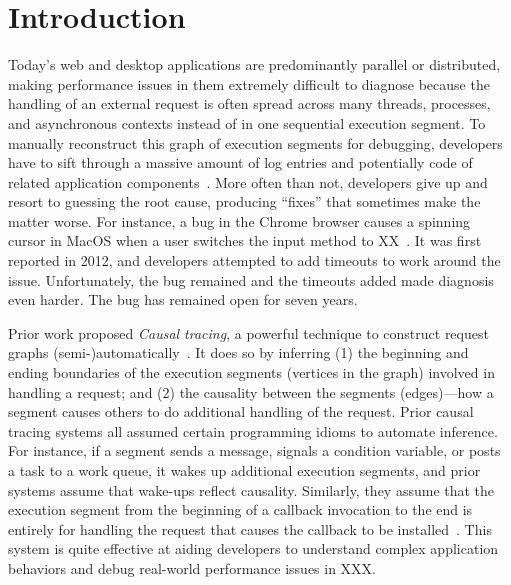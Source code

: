 \section{Introduction} \label{sec:intro}
%

%

Today's web and desktop applications are predominantly parallel or
distributed, making performance issues in them extremely difficult to
diagnose because the handling of an external request is often spread
across many threads, processes, and asynchronous
contexts
instead of in one
sequential execution segment.  To manually reconstruct this graph of
execution segments for debugging, developers have to sift through a
massive amount of log entries and potentially code of related application
components~\cite{luXXXXX}.  More often than not, developers give up and resort to
guessing the root cause, producing ``fixes'' that sometimes make the matter
worse.  For instance, a bug in the Chrome browser causes a spinning cursor
in MacOS when a user switches the input method to XX~\cite{bug-url}.  It
was first reported in 2012, and developers attempted to add timeouts
to work around the issue.  Unfortunately, the bug remained and the timeouts
added made diagnosis even harder.  The bug has remained open for seven years.

Prior work proposed \emph{Causal tracing}, a powerful technique to
construct request graphs (semi-)automatically~\cite{xxx}. It does so by
inferring (1) the beginning and ending boundaries of the execution
segments (vertices in the graph) involved in handling a request; and (2)
the causality between the segments (edges)---how a segment causes others
to do additional handling of the request.  Prior causal tracing systems
all assumed certain programming idioms to automate inference.  For
instance, if a segment sends a message, signals a condition variable, or
posts a task to a work queue, it wakes up additional execution segments,
and prior systems assume that wake-ups reflect causality.  Similarly, they
assume that the execution segment from the beginning of a callback
invocation to the end is entirely for handling the request that causes the
callback to be installed~\cite{}.  This system is quite effective at
aiding developers to understand complex application behaviors and debug
real-world performance issues in XXX.


